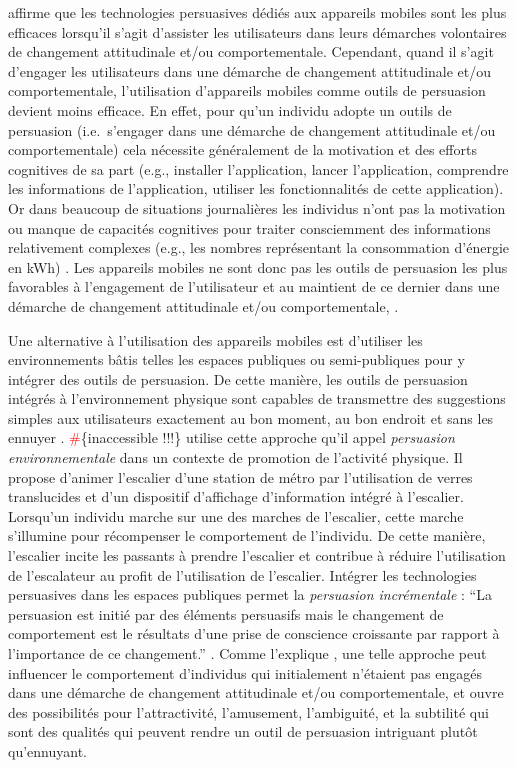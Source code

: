 \documentclass[10pt,a5paper,twoside]{article}
\begin{document}
\citet{fogg2002persuasive} affirme que les technologies persuasives
dédiés aux appareils mobiles sont les plus efficaces lorsqu'il s'agit
d'assister les utilisateurs dans leurs démarches volontaires de
changement attitudinale et/ou comportementale. Cependant, quand il
s'agit d'engager les utilisateurs dans une démarche de changement
attitudinale et/ou comportementale, l'utilisation d'appareils mobiles
comme outils de persuasion
\citep{fogg1998persuasive}\citep{fogg2002persuasive} devient moins
efficace. En effet, pour qu'un individu adopte un outils de persuasion
(i.e.~s'engager dans une démarche de changement attitudinale et/ou
comportementale) cela nécessite généralement de la motivation et des
efforts cognitives de sa part (e.g., installer l'application, lancer
l'application, comprendre les informations de l'application, utiliser
les fonctionnalités de cette application). Or dans beaucoup de
situations journalières les individus n'ont pas la motivation ou manque
de capacités cognitives pour traiter consciemment des informations
relativement complexes (e.g., les nombres représentant la consommation
d'énergie en kWh) \citep{wyer1997automaticity}. Les appareils mobiles ne
sont donc pas les outils de persuasion les plus favorables à
l'engagement de l'utilisateur et au maintient de ce dernier dans une
démarche de changement attitudinale et/ou comportementale, .

Une alternative à l'utilisation des appareils mobiles est d'utiliser les
environnements bâtis telles les espaces publiques ou semi-publiques pour
y intégrer des outils de persuasion. De cette manière, les outils de
persuasion intégrés à l'environnement physique sont capables de
transmettre des suggestions simples aux utilisateurs exactement au bon
moment, au bon endroit et sans les ennuyer
\citep{intille2004ubiquitous}. \textcolor{red}\#\{inaccessible !!!\}
\citet{mathew2005using} utilise cette approche qu'il appel
\emph{persuasion environnementale} dans un contexte de promotion de
l'activité physique. Il propose d'animer l'escalier d'une station de
métro par l'utilisation de verres translucides et d'un dispositif
d'affichage d'information intégré à l'escalier. Lorsqu'un individu
marche sur une des marches de l'escalier, cette marche s'illumine pour
récompenser le comportement de l'individu. De cette manière, l'escalier
incite les passants à prendre l'escalier et contribue à réduire
l'utilisation de l'escalateur au profit de l'utilisation de l'escalier.
Intégrer les technologies persuasives dans les espaces publiques permet
la \emph{persuasion incrémentale} : ``La persuasion est initié par des
éléments persuasifs mais le changement de comportement est le résultats
d'une prise de conscience croissante par rapport à l'importance de ce
changement.'' \citep{mathew2005using}. Comme l'explique
\citet{davis2008towards}, une telle approche peut influencer le
comportement d'individus qui initialement n'étaient pas engagés dans une
démarche de changement attitudinale et/ou comportementale, et ouvre des
possibilités pour l'attractivité, l'amusement, l'ambiguité, et la
subtilité qui sont des qualités qui peuvent rendre un outil de
persuasion intriguant plutôt qu'ennuyant.
\end{document}
